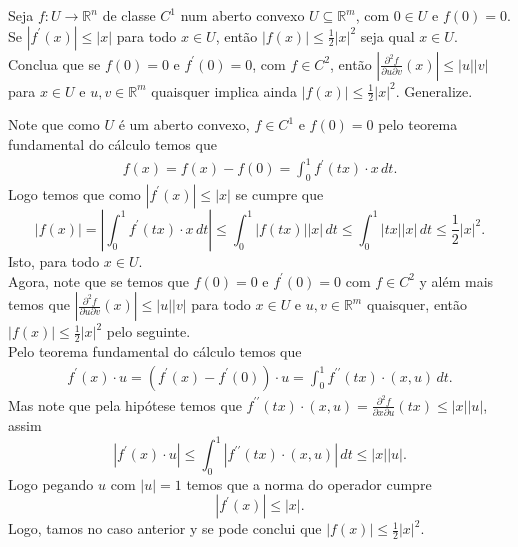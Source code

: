 \begin{homeworkProblem}[Seção 3-1]
  Seja $f:U\to\mathbb{R}^{n}$ de classe $C^{1}$ num aberto convexo $U\subseteq\mathbb{R}^{m}$, com $0\in U$ e $f(0)=0$. Se $|f^{\prime}(x)|\leq |x|$ para todo $x\in U$, então $|f(x)|\leq \frac{1}{2}|x|^{2}$ seja qual $x\in U$. Conclua que se $f(0)=0$ e $f^{\prime}(0)=0$, com $f\in C^{2}$, então $\left| \frac{\partial^{2}f }{\partial u\partial v}(x) \right|\leq |u||v|$ para $x\in U$ e $u,v\in\mathbb{R}^{m}$ quaisquer implica ainda $|f(x)|\leq\frac{1}{2}|x|^{2}$. Generalize.
  \begin{solution}
    Note que como $U$ é um aberto convexo, $f\in C^{1}$ e $f(0)=0$  pelo teorema fundamental do cálculo temos que
    \begin{align*}
      f(x)=f(x)-f(0)=\int_{0}^{1}f^{\prime}(tx)\cdot x\,dt.
    \end{align*}
    Logo temos que como $|f^{\prime}(x)|\leq |x|$ se cumpre que 
    \begin{equation}\label{eq:3-1-3}
      |f(x)|=\left| \int_{0}^{1}f^{\prime}(tx)\cdot x\,dt \right|\leq \int_{0}^{1}|f(tx)||x|\,dt\leq \int_{0}^{1}|tx||x|\,dt\leq \frac{1}{2}|x|^{2}.
    \end{equation}
    Isto, para todo $x\in U$.\\

    Agora, note que se temos que $f(0)=0$ e $f^{\prime}(0)=0$ com $f\in C^{2}$ y além mais temos que $\left| \frac{\partial^{2}f }{\partial u\partial v}(x) \right|\leq |u||v|$ para todo $x\in U$ e $u,v\in\mathbb{R}^{m}$ quaisquer, então $|f(x)|\leq\frac{1}{2}|x|^{2}$ pelo seguinte.\\
    Pelo teorema fundamental do cálculo temos que
    \begin{align*}
      f^{\prime}(x)\cdot u=(f^{\prime}(x)-f^{\prime}(0))\cdot u=\int_{0}^{1}f^{\prime\prime}(tx)\cdot (x,u)\,dt.
    \end{align*}
    Mas note que pela hipótese temos que $f^{\prime\prime}(tx)\cdot (x,u)=\frac{\partial^{2}f }{\partial x\partial u}(tx)\leq |x||u|$, assim
    \begin{equation}\label{eq:3-1-1}
      |f^{\prime}(x)\cdot u|\leq \int_{0}^{1}\left| f^{\prime\prime}(tx)\cdot (x,u) \right|\,dt\leq |x||u|.
    \end{equation}
    Logo pegando $u$ com $\left| u \right|=1$ temos que a norma do operador cumpre
    \begin{equation}\label{eq:3-1-2}
      |f^{\prime}(x)|\leq |x|.
    \end{equation}
    Logo, tamos no caso anterior y se pode conclui que $|f(x)|\leq\frac{1}{2}\left| x \right|^{2}$.\\


\end{solution}
\end{homeworkProblem}
